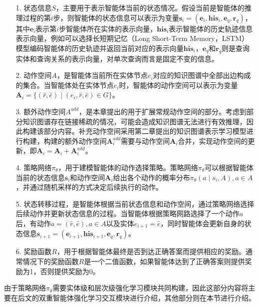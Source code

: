 \documentclass[algorithmlist, AutoFakeBold, AutoFakeSlant, figurelist, tablelist, nomlist, masters]{seuthesix}
\begin{document}
\begin{itemize}
  \item [1.] 状态信息$S$，主要用于表示智能体当前的状态情况。假设当前是智能体的推理过程的第$i$步，则智能体的状态信息可以表示为变量$\bm{s}_i = (\bm{e}_i, \bm{his}_i, \bm{e}_q, \bm{r}_q)$，其中$\bm{e}_i$表示第$i$步智能体所在实体的表示向量，$\bm{his}_i$表示智能体的历史轨迹信息表示向量，例如可以选择长短期记忆（Long Short-Term Memory，LSTM）模型编码智能体的历史轨迹并返回当前对应的表示向量$\bm{his}_i$，$\bm{e}_q$和$\bm{r}_q$则是查询实体和查询关系的表示向量，对单次查询而言是固定不变的信息。
  \item [2.] 动作空间$A$，是智能体当前所在实体节点$e_i$对应的知识图谱中全部出边构成的集合。当智能体处在实体节点$e_i$时，智能体的动作空间可以表示为变量$\bm{A}_i = \{(\hat{r}, \hat{e}) \mid (e_i, \hat{r}, \hat{e}) \in G\}$。
  \item [3.] 额外动作空间$A^{add}$，是本章提出的用于扩展常规动作空间的部分。考虑到部分知识图谱存在链接稀疏的情况，可能会造成知识图谱无法进行有效推理，因此构建该部分内容。补充动作空间采用第二章提出的知识图谱表示学习模型进行构建，构建的额外动作空间$\bm{A}_{i}^{add}$需要与动作空间$\bm{A}_i$合并，实现动作空间的更新，即$\bm{A}_i = \bm{A}_i + \bm{A}_{i}^{add} $。
  \item [4.] 策略网络$\pi_\theta$，用于建模智能体的动作选择策略。策略网络$\pi_\theta$可以根据智能体当前的状态信息$\bm{s}_i$和动作空间$\bm{A}_i$给出各个动作的概率分布$\pi_\theta(a \mid s_i, A), a \in A$，并通过随机采样的方式决定后续执行的动作。
  \item [5.] 状态转移过程，是智能体根据当前状态信息和动作空间，通过策略网络选择后续动作并更新状态信息的过程。当智能体根据策略网路选择了一个动作$a$后，有动作$a = (\hat{r}, \hat{e}), a \in A$以及实体$e_{i+1}=\hat{e}$，同时智能体会更新自身的状态信息$\bm{s}_{i+1} = (\bm{e}_{i+1}, \bm{his}_{i+1}, \bm{e}_q, \bm{r}_q)$。
  \item [6.] 奖励函数$R$，用于根据智能体最终是否到达正确答案而提供相应的奖励。通常情况下的奖励函数$R$是一个二值函数，如果智能体达到了正确答案则提供奖励为1，否则提供奖励为0。
\end{itemize}
由于策略网络$\pi_\theta$需要实体级和层次级强化学习模块共同构建，因此这部分内容将主要在后文的双重智能体强化学习交互模块进行介绍，其他部分则在本节进行介绍。
\end{document}
